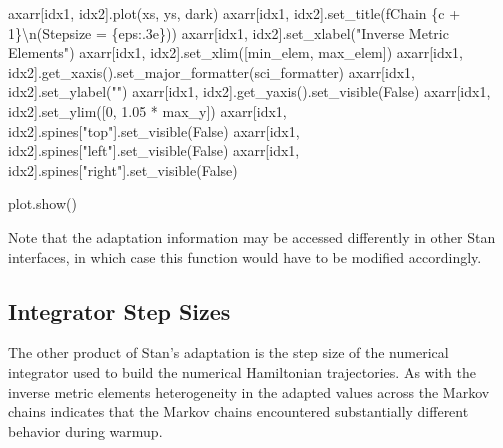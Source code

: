\documentclass[
  letterpaper,
  DIV=11,
  numbers=noendperiod]{scrartcl}
\newenvironment{Shaded}{\begin{snugshade}}{\end{snugshade}}
\newcommand{\CharTok}[1]{\textcolor[rgb]{0.13,0.47,0.30}{#1}}
\newcommand{\DecValTok}[1]{\textcolor[rgb]{0.68,0.00,0.00}{#1}}
\newcommand{\FloatTok}[1]{\textcolor[rgb]{0.68,0.00,0.00}{#1}}
\newcommand{\NormalTok}[1]{\textcolor[rgb]{0.00,0.23,0.31}{#1}}
\newcommand{\OperatorTok}[1]{\textcolor[rgb]{0.37,0.37,0.37}{#1}}
\newcommand{\SpecialCharTok}[1]{\textcolor[rgb]{0.37,0.37,0.37}{#1}}
\newcommand{\SpecialStringTok}[1]{\textcolor[rgb]{0.13,0.47,0.30}{#1}}
\newcommand{\StringTok}[1]{\textcolor[rgb]{0.13,0.47,0.30}{#1}}
\newcommand{\VariableTok}[1]{\textcolor[rgb]{0.07,0.07,0.07}{#1}}
\begin{document}
\begin{Shaded}
\begin{Highlighting}[]
\NormalTok{    axarr[idx1, idx2].plot(xs, ys, dark)}
\NormalTok{    axarr[idx1, idx2].set\_title(}\SpecialStringTok{f\textquotesingle{}Chain }\SpecialCharTok{\{}\NormalTok{c }\OperatorTok{+} \DecValTok{1}\SpecialCharTok{\}}\CharTok{\textbackslash{}n}\SpecialStringTok{(Stepsize = }\SpecialCharTok{\{}\NormalTok{eps}\SpecialCharTok{:.3e\}}\SpecialStringTok{)\textquotesingle{}}\NormalTok{)}
\NormalTok{    axarr[idx1, idx2].set\_xlabel(}\StringTok{"Inverse Metric Elements"}\NormalTok{)}
\NormalTok{    axarr[idx1, idx2].set\_xlim([min\_elem, max\_elem])}
\NormalTok{    axarr[idx1, idx2].get\_xaxis().set\_major\_formatter(sci\_formatter)}
\NormalTok{    axarr[idx1, idx2].set\_ylabel(}\StringTok{""}\NormalTok{)}
\NormalTok{    axarr[idx1, idx2].get\_yaxis().set\_visible(}\VariableTok{False}\NormalTok{)}
\NormalTok{    axarr[idx1, idx2].set\_ylim([}\DecValTok{0}\NormalTok{, }\FloatTok{1.05} \OperatorTok{*}\NormalTok{ max\_y])}
\NormalTok{    axarr[idx1, idx2].spines[}\StringTok{"top"}\NormalTok{].set\_visible(}\VariableTok{False}\NormalTok{)}
\NormalTok{    axarr[idx1, idx2].spines[}\StringTok{"left"}\NormalTok{].set\_visible(}\VariableTok{False}\NormalTok{)}
\NormalTok{    axarr[idx1, idx2].spines[}\StringTok{"right"}\NormalTok{].set\_visible(}\VariableTok{False}\NormalTok{)}
  
\NormalTok{  plot.show()}
\end{Highlighting}
\end{Shaded}

Note that the adaptation information may be accessed differently in
other Stan interfaces, in which case this function would have to be
modified accordingly.

\subsection{Integrator Step Sizes}\label{integrator-step-sizes}

The other product of Stan's adaptation is the step size of the numerical
integrator used to build the numerical Hamiltonian trajectories. As with
the inverse metric elements heterogeneity in the adapted values across
the Markov chains indicates that the Markov chains encountered
substantially different behavior during warmup.
\end{document}
